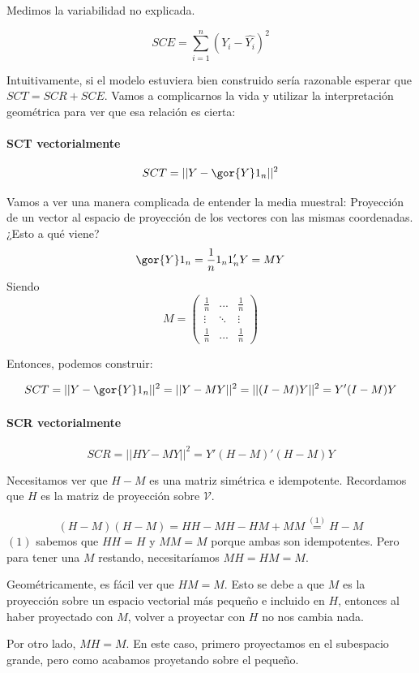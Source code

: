 \begin{defn}
Medimos la variabilidad no explicada.

\[SCE = \sum_{i=1}^n (Y_i - \hat{Y_i})^2\]

\end{defn}


Intuitivamente, si el modelo estuviera bien construido sería razonable esperar que $SCT = SCR + SCE$.
Vamos a complicarnos la vida y utilizar la interpretación geométrica para ver que esa relación es cierta:


\paragraph{SCT vectorialmente}

\[
SCT = ||Y - \gor{Y}1_n||^2
\]

Vamos a ver una manera complicada de entender la media muestral: Proyección de un vector al espacio de proyección de los vectores con las mismas coordenadas. ¿Esto a qué viene?
\[
\gor{Y}1_n = \frac{1}{n}1_n1'_nY = MY
\]
Siendo \[M = \begin{pmatrix}\frac{1}{n} & ... & \frac{1}{n} \\ \vdots & \ddots & \vdots \\ \frac{1}{n} & ... & \frac{1}{n}\end{pmatrix}\]

Entonces, podemos construir:

\[
SCT = ||Y - \gor{Y}1_n||^2  = || Y-MY||^2 = ||(I-M) Y||^2 = Y'(I-M)Y
\]

\paragraph{SCR vectorialmente}
\[
SCR = || HY-MY||^2 = Y'(H-M)'(H-M)Y
\]

Necesitamos ver que $H-M$ es una matriz simétrica e idempotente. Recordamos que $H$ es la matriz de proyección sobre $\mathcal{V}$.

\[
(H-M)(H-M) = HH - MH - HM + MM \overset{(1)}{=} H - M
\]
$(1)$ sabemos que $HH = H$ y $MM=M$ porque ambas son idempotentes. Pero para tener una $M$ restando, necesitaríamos $MH = HM = M$.

Geométricamente, es fácil ver que $HM=M$. Esto se debe a que $M$ es la proyección sobre un espacio vectorial más pequeño e incluido en $H$, entonces al haber proyectado con $M$, volver a proyectar con $H$ no nos cambia nada.

Por otro lado, $MH = M$. En este caso, primero proyectamos en el subespacio grande, pero como acabamos proyetando sobre el pequeño.

